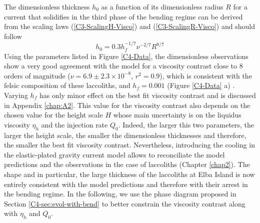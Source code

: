 The dimensionless thickness  $h_0$ as a function  of its dimensionless
radius $R$  for a current  that solidifies in  the third phase  of the
bending   regime    can   be    derived   from   the    scaling   laws
(\ref{C3-ScalingH-Visco})  and  (\ref{C3-ScalingR-Visco})  and  should
follow
\begin{equation}
  h_0 = 0.3 h_f^{-1/7}\nu^{-2/7}R^{8/7}\label{C4-Hr}
\end{equation}
Using the parameters listed in Figure \ref{C4-Data}, the dimensionless
observations show a very good agreement with the model for a viscosity
contrast      close      to      $8$     orders      of      magnitude
($\nu =  6.9\pm 2.3 \times  10^{-8}$, $r^2=0.9$), which  is consistent
with  the  felsic composition  of  these  laccoliths, and  $h_f=0.001$
(Figure \ref{C4-Data} a) \citep{Marsh:1981dc,Diniega:2013eh}.  Varying
$h_f$ has only minor effect on  the best fit viscosity contrast and is
discussed  in Appendix  \ref{chap:A2}.  This  value for  the viscosity
contrast also  depends on the  chosen value  for the height  scale $H$
whose main uncertainty  is on the liquidus viscosity  $\eta_h$ and the
injection rate  $Q_0$.  Indeed,  the larger  this two  parameters, the
larger the height scale, the smaller the dimensionless thicknesses and
therefore, the smaller the best fit viscosity contrast.  Nevertheless,
introducing the  cooling in  the elastic-plated gravity  current model
allows to reconciliate  the model predictions and  the observations in
the  case  of laccoliths  (Chapter  \ref{chap2}).   The shape  and  in
particular, the  large thickness of  the laccoliths at Elba  Island is
now entirely consistent with the  model predictions and therefore with
their arrest in the bending regime. In the following, we use the phase
diagram  proposed  in  Section \ref{C4-sec:evol-with-bend}  to  better
constrain the viscosity contrast along with $\eta_h$ and $Q_0$.

